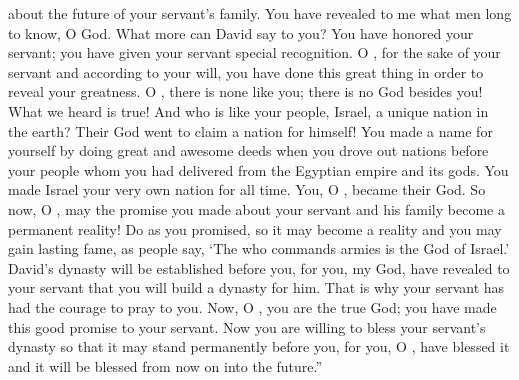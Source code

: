 {about the future
of your servant’s
family.
You have revealed
to me what men
long to know,
O
{}
God.
What
more
can David
say
to
you? You have honored
your servant;
you
have given your servant
special recognition.
O
{}, for the sake of
your servant
and according
to your will, you have done
this
great thing
in order to reveal
your greatness.
O
{}, there is none
like
you; there is no
God
besides
you! What we heard
is true!
And who
is like your people,
Israel,
a unique
nation
in the earth? Their God
went
to claim
a nation
for himself! You made
a name
for yourself by doing great
and awesome
deeds when you drove
out nations before
your people
whom
you had delivered
from the Egyptian
empire and its gods.
You made
Israel
your very
own
nation
for all time. You,
O
{}, became
their God.
So now,
O
{}, may the promise
you made
about your servant
and his family
become
a permanent
reality! Do
as
you promised,
so it may become a reality
and you may gain lasting
fame,
as people say, ‘The
{}
who commands armies
is the God
of Israel.’
David’s
dynasty
will be established
before you,
for
you,
my God,
have revealed
to your servant
that you will build
a dynasty
for him. That is why
your servant
has had
the courage
to pray
to you.
Now,
O
{}, you
are the true God;
you have
made this
good
promise
to your servant.
Now
you are willing
to bless
your servant’s
dynasty
so that it may
stand permanently
before
you, for
you,
O
{}, have blessed
it and it will be blessed
from now on into the future.”

}
